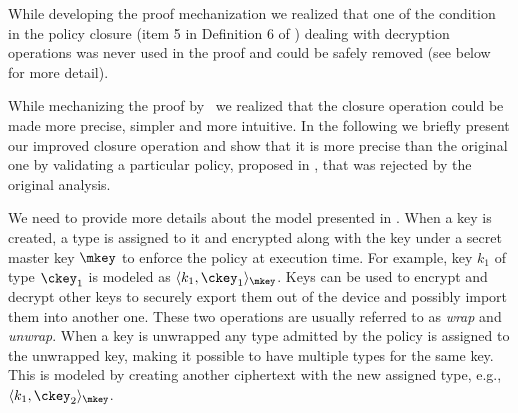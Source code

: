 While developing the proof mechanization we realized that one of the condition in the policy closure (item 5 in Definition 6 of \cite{focardi2021secure}) dealing with decryption operations was never
used in the proof and could be safely removed (see below for more detail).

While mechanizing  the proof by~\citet{focardi2021secure} we realized that the closure operation could be made more precise, simpler and more intuitive.
In the following we briefly present our improved closure operation and show that it is more precise than the original one by validating a particular policy, proposed in \cite{BCFS-ccs10}, that was rejected by the original analysis.

We need to provide more details about the model presented in \cite{focardi2021secure}.
When a key is created, a type is assigned to it and encrypted along with the key under a secret master key $\mkey$ to enforce the policy at execution time.
For example, key $k_1$ of type $\ckey_1$ is  modeled as $\enc{k_1,\ckey_1}{\mkey}$.
Keys can be used to encrypt and decrypt other keys to securely export them out of the device and possibly import them into another one.
These two operations are usually referred to as \emph{wrap} and \emph{unwrap}.
When a key is unwrapped any type admitted by the policy is assigned to the unwrapped key, making it possible to have multiple types for the same key.
This is modeled by creating another ciphertext with the new assigned type, e.g., $\enc{k_1,\ckey_2}{\mkey}$.

